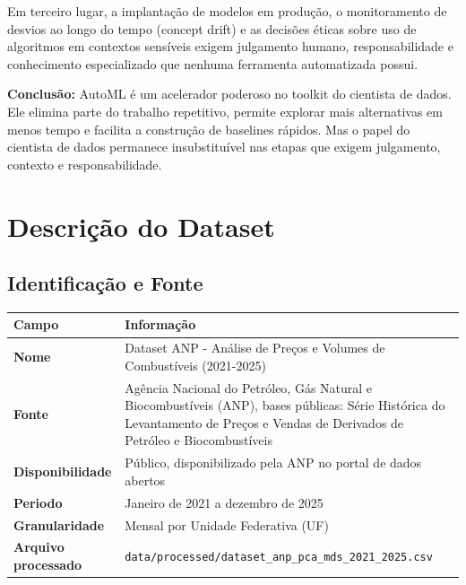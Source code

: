 \documentclass[11pt, a4paper, oneside]{article}
\newcommand{\taltrow}{\rowcolor{tablealt}}
\begin{document}
Em terceiro lugar, a implantação de modelos em produção, o monitoramento de desvios
ao longo do tempo (concept drift) e as decisões éticas sobre uso de algoritmos em
contextos sensíveis exigem julgamento humano, responsabilidade e conhecimento
especializado que nenhuma ferramenta automatizada possui.

\begin{infobox}
\textbf{Conclusão:} AutoML é um acelerador poderoso no toolkit do cientista de dados.
Ele elimina parte do trabalho repetitivo, permite explorar mais alternativas em menos
tempo e facilita a construção de baselines rápidos. Mas o papel do cientista de dados
permanece insubstituível nas etapas que exigem julgamento, contexto e responsabilidade.
\end{infobox}

\newpage

\section{Descrição do Dataset}
\label{sec:dataset}

\subsection{Identificação e Fonte}
\label{sec:dataset-fonte}

\begin{tabularx}{\textwidth}{@{}L{4.5cm} Y@{}}
  \toprule
  \textbf{Campo} & \textbf{Informação} \\
  \midrule
  \taltrow \textbf{Nome} & Dataset ANP - Análise de Preços e Volumes de Combustíveis (2021-2025) \\
  \textbf{Fonte} & Agência Nacional do Petróleo, Gás Natural e Biocombustíveis (ANP), bases públicas: Série Histórica do Levantamento de Preços e Vendas de Derivados de Petróleo e Biocombustíveis \\
  \taltrow \textbf{Disponibilidade} & Público, disponibilizado pela ANP no portal de dados abertos \\
  \textbf{Periodo} & Janeiro de 2021 a dezembro de 2025 \\
  \taltrow \textbf{Granularidade} & Mensal por Unidade Federativa (UF) \\
  \textbf{Arquivo processado} & \texttt{data/processed/dataset\_anp\_pca\_mds\_2021\_2025.csv} \\
  \bottomrule
\end{tabularx}
\end{document}
